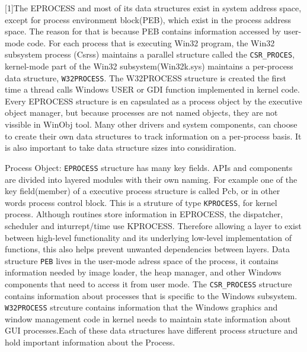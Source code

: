 \documentclass[letterpaper,10pt,draftclsnofoot,onecolumn]{IEEEtran}
\begin{document}
[1]The EPROCESS and most of its data structures exist in system address space, except for process environment block(PEB), which exist in the process address space. The reason for that is because PEB contains information accessed by user-mode code. For each process that is executing Win32 program, the Win32 subsystem process (Csrss) maintains a parallel structure called the \verb|CSR_PROCES|, kernel-mode part of the Win32 subsystem(Win32k.sys) maintains a per-process data structure, \verb|W32PROCESS|. The W32PROCESS structure is created the first time a thread calls Windows USER or GDI function implemented in kernel code. Every EPROCESS structure is en capsulated as a process object by the executive object manager, but because processes are not named objects, they are not vissible in WinObj tool. Many other drivers and system components, can choose to create their own data structures to track information on a per-process basis. It is also important to take data structure sizes into considiration.

Process Object: \verb|EPROCESS| structure has many key fields. APIs and components are divided into layered modules with their own naming. For example one of the key field(member) of a executive process structure is called Pcb, or in other words process control block. This is a struture of type \verb|KPROCESS|, for kernel process. Although routines store information in EPROCESS, the dispatcher, scheduler and inturrept/time use KPROCESS. Therefore allowing a layer to exist between high-level functionality and its underlying low-level implementation of functions, this also helps prevent unwanted dependencies between layers. Data structure \verb|PEB| lives in the user-mode adress space of the process, it contains information needed by image loader, the heap manager, and other Windows components that need to access it from user mode. The \verb|CSR_PROCESS| structure contains information about processes that is specific to the Windows subsystem. \verb|W32PROCESS| strcuture contains information that the Windows graphics and window management code in kernel needs to maintain state information about GUI processes.Each of these data structures have different process structure and hold important information about the Process.
\end{document}
